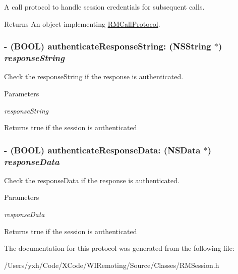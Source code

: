 A call protocol to handle session credentials for subsequent calls. \begin{DoxyReturn}{Returns}
An object implementing \hyperlink{protocol_r_m_call_protocol-p}{RMCallProtocol}. 
\end{DoxyReturn}
\hypertarget{protocol_r_m_authenticator-p_adf5dc80e89981e86b61d1720ad441c79}{
\subsubsection[{authenticateResponseString:}]{\setlength{\rightskip}{0pt plus 5cm}-\/ (BOOL) authenticateResponseString: (NSString $\ast$) {\em responseString}}}
\label{protocol_r_m_authenticator-p_adf5dc80e89981e86b61d1720ad441c79}


Check the responseString if the response is authenticated. 
\begin{DoxyParams}{Parameters}
\item[{\em responseString}]\end{DoxyParams}
\begin{DoxyReturn}{Returns}
true if the session is authenticated 
\end{DoxyReturn}
\hypertarget{protocol_r_m_authenticator-p_aa82480a76b720c6497425661de692eea}{
\subsubsection[{authenticateResponseData:}]{\setlength{\rightskip}{0pt plus 5cm}-\/ (BOOL) authenticateResponseData: (NSData $\ast$) {\em responseData}}}
\label{protocol_r_m_authenticator-p_aa82480a76b720c6497425661de692eea}


Check the responseData if the response is authenticated. 
\begin{DoxyParams}{Parameters}
\item[{\em responseData}]\end{DoxyParams}
\begin{DoxyReturn}{Returns}
true if the session is authenticated 
\end{DoxyReturn}


The documentation for this protocol was generated from the following file:\begin{DoxyCompactItemize}
\item 
/Users/yxh/Code/XCode/WIRemoting/Source/Classes/RMSession.h\end{DoxyCompactItemize}
